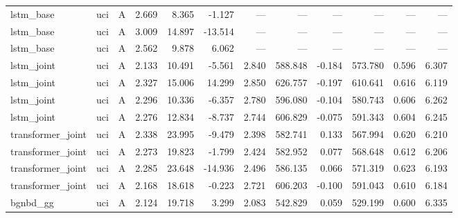 \begin{table}
\begin{tabular}{lllrrrrrrrrr}
lstm_base & uci & A & 2.669 & 8.365 & -1.127 & — & — & — & — & — & — \\
lstm_base & uci & A & 3.009 & 14.897 & -13.514 & — & — & — & — & — & — \\
lstm_base & uci & A & 2.562 & 9.878 & 6.062 & — & — & — & — & — & — \\
lstm_joint & uci & A & 2.133 & 10.491 & -5.561 & 2.840 & 588.848 & -0.184 & 573.780 & 0.596 & 6.307 \\
lstm_joint & uci & A & 2.327 & 15.006 & 14.299 & 2.850 & 626.757 & -0.197 & 610.641 & 0.616 & 6.119 \\
lstm_joint & uci & A & 2.296 & 10.336 & -6.357 & 2.780 & 596.080 & -0.104 & 580.743 & 0.606 & 6.262 \\
lstm_joint & uci & A & 2.276 & 12.834 & -8.737 & 2.744 & 606.829 & -0.075 & 591.343 & 0.604 & 6.245 \\
transformer_joint & uci & A & 2.338 & 23.995 & -9.479 & 2.398 & 582.741 & 0.133 & 567.994 & 0.620 & 6.210 \\
transformer_joint & uci & A & 2.273 & 19.823 & -1.799 & 2.424 & 582.952 & 0.077 & 568.648 & 0.612 & 6.206 \\
transformer_joint & uci & A & 2.285 & 23.648 & -14.936 & 2.496 & 586.135 & 0.066 & 571.319 & 0.623 & 6.193 \\
transformer_joint & uci & A & 2.168 & 18.618 & -0.223 & 2.721 & 606.203 & -0.100 & 591.043 & 0.610 & 6.184 \\
bgnbd_gg & uci & A & 2.124 & 19.718 & 3.299 & 2.083 & 542.829 & 0.059 & 529.199 & 0.600 & 6.335 \\
\bottomrule
\end{tabular}
\end{table}
